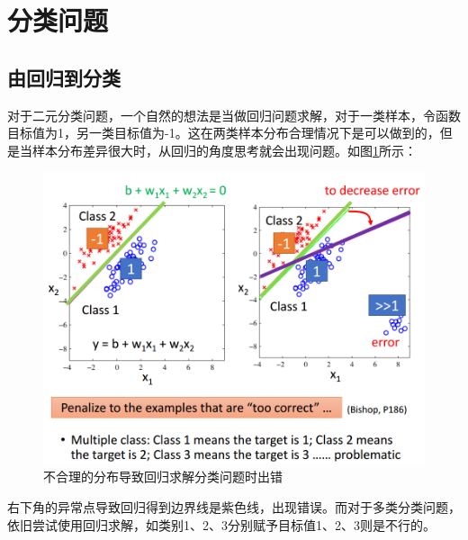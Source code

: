 \section{分类问题}
\subsection{由回归到分类}
对于二元分类问题，一个自然的想法是当做回归问题求解，对于一类样本，令函数目标值为1，另一类目标值为-1。这在两类样本分布合理情况下是可以做到的，但是当样本分布差异很大时，从回归的角度思考就会出现问题。如图\ref{fig:ref_to_classification}所示：
\begin{figure}
	\centering
	\includegraphics[scale=0.5]{pic/regression_to_classification.png}
	\caption{不合理的分布导致回归求解分类问题时出错}
	\label{fig:ref_to_classification}
\end{figure}
右下角的异常点导致回归得到边界线是紫色线，出现错误。而对于多类分类问题，依旧尝试使用回归求解，如类别1、2、3分别赋予目标值1、2、3则是不行的。